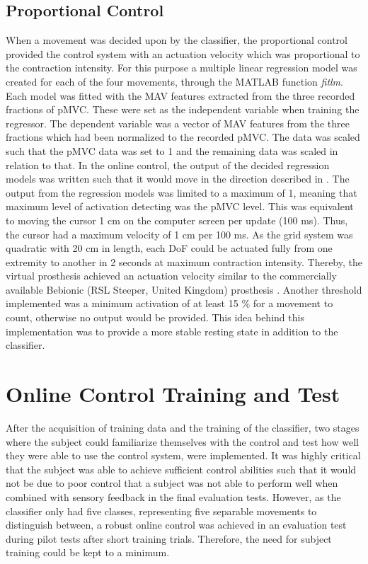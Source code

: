 \subsection{Proportional Control}  
When a movement was decided upon by the classifier, the proportional control provided the control system with an actuation velocity which was proportional to the contraction intensity. For this purpose a multiple linear regression model was created for each of the four movements, through the MATLAB function \textit{fitlm}. Each model was fitted with the MAV features extracted from the three recorded fractions of pMVC. These were set as the independent variable when training the regressor. The dependent variable was a vector of MAV features from the three fractions which had been normalized to the recorded pMVC. The data was scaled such that the pMVC data was set to 1 and the remaining data was scaled in relation to that. In the online control, the output of the decided regression models was written such that it would move in the direction described in . The output from the regression models was limited to a maximum of 1, meaning that maximum level of activation detecting was the pMVC level. This was equivalent to moving the cursor 1 cm on the computer screen per update (100 ms). Thus, the cursor had a maximum velocity of 1 cm per 100 ms. As the grid system was quadratic with 20 cm in length, each DoF could be actuated fully from one extremity to another in 2 seconds at maximum contraction intensity. Thereby, the virtual prosthesis achieved an actuation velocity similar to the commercially available Bebionic (RSL Steeper, United Kingdom) prosthesis \cite{Belter2013}.  Another threshold implemented was a minimum activation of at least 15 $\percent$ for a movement to count, otherwise no output would be provided. This idea behind this implementation was to provide a more stable resting state in addition to the classifier. 


\section{Online Control Training and Test} \label{sec:meth:contraintest}

After the acquisition of training data and the training of the classifier, two stages where the subject could familiarize themselves with the control and test how well they were able to use the control system, were implemented. It was highly critical that the subject was able to achieve sufficient control abilities such that it would not be due to poor control that a subject was not able to perform well when combined with sensory feedback in the final evaluation tests. However, as the classifier only had five classes, representing five separable movements to distinguish between, a robust online control was achieved in an evaluation test during pilot tests after short training trials. Therefore, the need for subject training could be kept to a minimum.  

